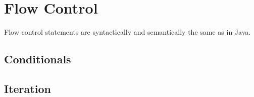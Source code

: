 \section{Flow Control}
Flow control statements are syntactically and semantically the same as in Java.

\subsection{Conditionals}
\vfil
{}
\vfil
{}
\vfil

\subsection{Iteration}




